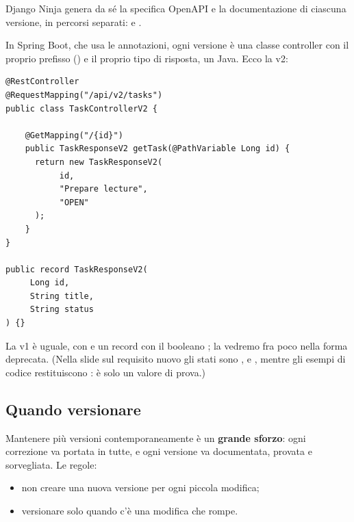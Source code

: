Django Ninja genera da sé la specifica OpenAPI e la documentazione di ciascuna
versione, in percorsi separati:  e .

In Spring Boot, che usa le annotazioni, ogni versione è una classe controller
con il proprio prefisso () e il proprio tipo di risposta,
un  Java. Ecco la v2:

\begin{affianco}[0.6]
\codicepiccolo
\begin{lstlisting}[style=java, name=TaskControllerV2.java]
@RestController
@RequestMapping("/api/v2/tasks")
public class TaskControllerV2 {

    @GetMapping("/{id}")
    public TaskResponseV2 getTask(@PathVariable Long id) {
      return new TaskResponseV2(
           id,
           "Prepare lecture",
           "OPEN"
      );
    }
}

public record TaskResponseV2(
     Long id,
     String title,
     String status
) {}
\end{lstlisting}
\risultato
{}
\end{affianco}

La v1 è uguale, con  e un record
 con il booleano ; la vedremo fra poco
nella forma deprecata. (Nella slide sul requisito nuovo gli stati sono
,  e , mentre gli esempi di codice
restituiscono : è solo un valore di prova.)

\subsection{Quando versionare}

Mantenere più versioni contemporaneamente è un \textbf{grande sforzo}: ogni
correzione va portata in tutte, e ogni versione va documentata, provata e
sorvegliata. Le regole:

\begin{itemize}
  \item non creare una nuova versione per ogni piccola modifica;
  \item versionare solo quando c'è una modifica che rompe.
\end{itemize}

